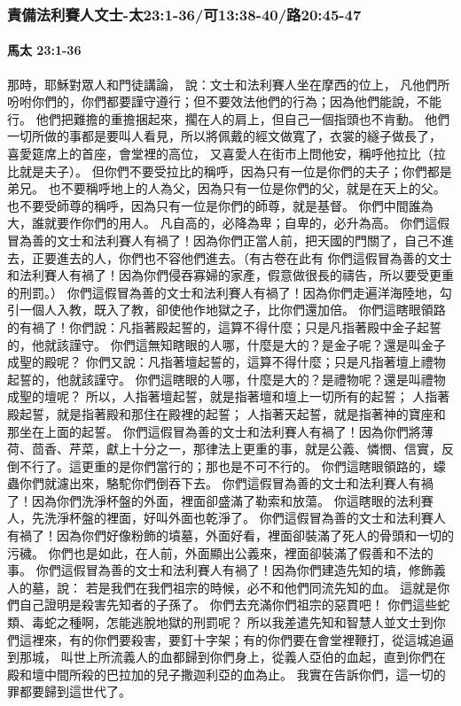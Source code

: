 \subsubsection{責備法利賽人文士-太23:1-36/可13:38-40/路20:45-47}
\paragraph{馬太 23:1-36}
那時，耶穌對眾人和門徒講論，
說：文士和法利賽人坐在摩西的位上，
凡他們所吩咐你們的，你們都要謹守遵行；但不要效法他們的行為；因為他們能說，不能行。
他們把難擔的重擔捆起來，擱在人的肩上，但自己一個指頭也不肯動。
他們一切所做的事都是要叫人看見，所以將佩戴的經文做寬了，衣裳的繸子做長了，
喜愛筵席上的首座，會堂裡的高位，
又喜愛人在街市上問他安，稱呼他拉比（拉比就是夫子）。
但你們不要受拉比的稱呼，因為只有一位是你們的夫子；你們都是弟兄。
也不要稱呼地上的人為父，因為只有一位是你們的父，就是在天上的父。
也不要受師尊的稱呼，因為只有一位是你們的師尊，就是基督。
你們中間誰為大，誰就要作你們的用人。
凡自高的，必降為卑；自卑的，必升為高。
你們這假冒為善的文士和法利賽人有禍了！因為你們正當人前，把天國的門關了，自己不進去，正要進去的人，你們也不容他們進去。（有古卷在此有
你們這假冒為善的文士和法利賽人有禍了！因為你們侵吞寡婦的家產，假意做很長的禱告，所以要受更重的刑罰。）
你們這假冒為善的文士和法利賽人有禍了！因為你們走遍洋海陸地，勾引一個人入教，既入了教，卻使他作地獄之子，比你們還加倍。
你們這瞎眼領路的有禍了！你們說：凡指著殿起誓的，這算不得什麼；只是凡指著殿中金子起誓的，他就該謹守。
你們這無知瞎眼的人哪，什麼是大的？是金子呢？還是叫金子成聖的殿呢？
你們又說：凡指著壇起誓的，這算不得什麼；只是凡指著壇上禮物起誓的，他就該謹守。
你們這瞎眼的人哪，什麼是大的？是禮物呢？還是叫禮物成聖的壇呢？
所以，人指著壇起誓，就是指著壇和壇上一切所有的起誓；
人指著殿起誓，就是指著殿和那住在殿裡的起誓；
人指著天起誓，就是指著神的寶座和那坐在上面的起誓。
你們這假冒為善的文士和法利賽人有禍了！因為你們將薄荷、茴香、芹菜，獻上十分之一，那律法上更重的事，就是公義、憐憫、信實，反倒不行了。這更重的是你們當行的；那也是不可不行的。
你們這瞎眼領路的，蠓蟲你們就濾出來，駱駝你們倒吞下去。
你們這假冒為善的文士和法利賽人有禍了！因為你們洗淨杯盤的外面，裡面卻盛滿了勒索和放蕩。
你這瞎眼的法利賽人，先洗淨杯盤的裡面，好叫外面也乾淨了。
你們這假冒為善的文士和法利賽人有禍了！因為你們好像粉飾的墳墓，外面好看，裡面卻裝滿了死人的骨頭和一切的污穢。
你們也是如此，在人前，外面顯出公義來，裡面卻裝滿了假善和不法的事。
你們這假冒為善的文士和法利賽人有禍了！因為你們建造先知的墳，修飾義人的墓，說：
若是我們在我們祖宗的時候，必不和他們同流先知的血。
這就是你們自己證明是殺害先知者的子孫了。
你們去充滿你們祖宗的惡貫吧！
你們這些蛇類、毒蛇之種啊，怎能逃脫地獄的刑罰呢？
所以我差遣先知和智慧人並文士到你們這裡來，有的你們要殺害，要釘十字架；有的你們要在會堂裡鞭打，從這城追逼到那城，
叫世上所流義人的血都歸到你們身上，從義人亞伯的血起，直到你們在殿和壇中間所殺的巴拉加的兒子撒迦利亞的血為止。
我實在告訴你們，這一切的罪都要歸到這世代了。

